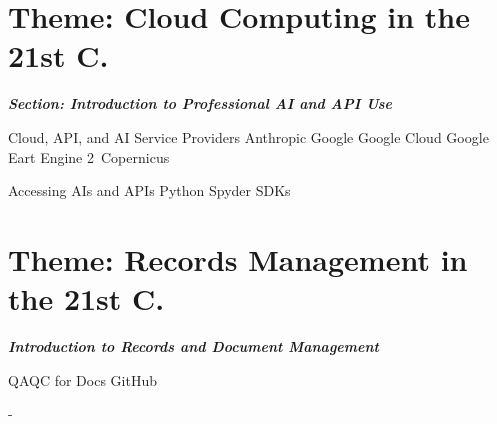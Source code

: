 \documentclass[12pt, letterpaper]{article}
\begin{document}
\section{Theme: Cloud Computing in the 21st C.}

\large
\begin{flushleft}
\textbf{\textit{Section: Introduction to Professional AI and API Use}}
\end{flushleft}
\normalsize

\begin{outline}[enumerate]
\1 Cloud, API, and AI Service Providers
\2 Anthropic
\2 Google
\3 Google Cloud
\3 Google Eart Engine
2\ Copernicus

\1 Accessing AIs and APIs
\2 Python
\2 Spyder
\2 SDKs


\end{outline}


\section{Theme: Records Management in the 21st C.}
\large
\begin{flushleft}
\textbf{\textit{Introduction to Records and Document Management}}
\end{flushleft}
\normalsize

\begin{outline}[enumerate]
\1 QAQC for Docs
\1 GitHub

\end{outline}

-





\clearpage 
\renewcommand{\thepage}{}
\printbibliography
\end{document}
